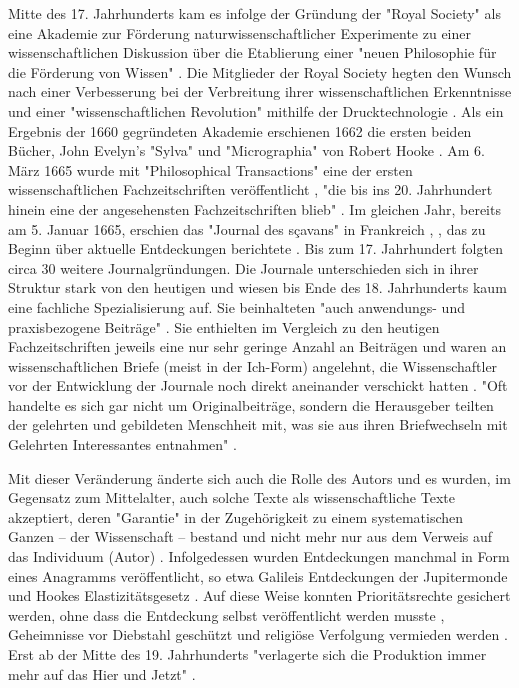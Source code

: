 Mitte des 17. Jahrhunderts kam es infolge der Gründung der "Royal Society" als eine Akademie zur Förderung naturwissenschaftlicher Experimente zu einer wissenschaftlichen Diskussion über die Etablierung einer "neuen Philosophie für die Förderung von Wissen" \cite{Frize_2013} \cite{Hall_1965}. Die Mitglieder der Royal Society hegten den Wunsch nach einer Verbesserung bei der Verbreitung ihrer wissenschaftlichen Erkenntnisse und einer "wissenschaftlichen Revolution" mithilfe der Drucktechnologie \cite{Dear_1985}. Als ein Ergebnis der 1660 gegründeten Akademie erschienen 1662 die ersten beiden Bücher, John Evelyn's "Sylva" und "Micrographia" von Robert Hooke \cite{Hall_1992}. Am 6. März 1665 wurde mit "Philosophical Transactions" eine der ersten wissenschaftlichen Fachzeitschriften veröffentlicht \cite{Peters_2014}, "die bis ins 20. Jahrhundert hinein eine der angesehensten Fachzeitschriften blieb" \cite[:53]{Graefen_2007}. Im gleichen Jahr, bereits am  5. Januar 1665, erschien das "Journal des sçavans" in Frankreich \cite{Ball_2011}, \cite{Hollricher_2009}, das zu Beginn über aktuelle Entdeckungen berichtete \cite{Weiner_2001}. Bis zum 17. Jahrhundert folgten circa 30 weitere Journalgründungen. Die Journale unterschieden sich in ihrer Struktur stark von den heutigen und wiesen bis Ende des 18. Jahrhunderts kaum eine fachliche Spezialisierung auf. Sie beinhalteten "auch anwendungs- und praxisbezogene Beiträge" \cite{Graefen_2007}. Sie enthielten im Vergleich zu den heutigen Fachzeitschriften jeweils eine nur sehr geringe Anzahl an Beiträgen und waren an wissenschaftlichen Briefe (meist in der Ich-Form) angelehnt, die Wissenschaftler vor der Entwicklung der Journale noch direkt aneinander verschickt hatten \cite{Weiner_2001}. "Oft handelte es sich gar nicht um Originalbeiträge, sondern die Herausgeber teilten der gelehrten und gebildeten Menschheit mit, was sie aus ihren Briefwechseln mit Gelehrten Interessantes entnahmen" \cite{Graefen_2007}.

Mit dieser Veränderung änderte sich auch die Rolle des Autors und es wurden, im Gegensatz zum Mittelalter, auch solche Texte als wissenschaftliche Texte akzeptiert, deren "Garantie" in der Zugehörigkeit zu einem systematischen Ganzen – der Wissenschaft – bestand und nicht mehr nur aus dem Verweis auf das Individuum (Autor) \cite{Foucault_2000}. Infolgedessen wurden Entdeckungen manchmal in Form eines Anagramms veröffentlicht, so etwa Galileis Entdeckungen der Jupitermonde \cite{Miner_2007} und Hookes Elastizitätsgesetz \cite{Szabo_2013}. Auf diese Weise konnten Prioritätsrechte gesichert werden, ohne dass die Entdeckung selbst veröffentlicht werden musste \cite{Miner_2007}, Geheimnisse vor Diebstahl geschützt und religiöse Verfolgung vermieden werden \cite{Resnik_2005}. Erst ab der Mitte des 19. Jahrhunderts "verlagerte sich die Produktion immer mehr auf das Hier und Jetzt" \cite[:28]{Hagner_2015}.

